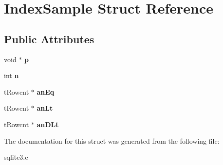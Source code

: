 \hypertarget{structIndexSample}{}\section{Index\+Sample Struct Reference}
\label{structIndexSample}
\subsection*{Public Attributes}
\begin{DoxyCompactItemize}
\item 
void $\ast$ {\bfseries p}\hypertarget{structIndexSample_a539f00d3096fd379146e77e74b513dac}{}\label{structIndexSample_a539f00d3096fd379146e77e74b513dac}

\item 
int {\bfseries n}\hypertarget{structIndexSample_a89016f3b6580ee9c63c4ac78e2e6e76c}{}\label{structIndexSample_a89016f3b6580ee9c63c4ac78e2e6e76c}

\item 
t\+Rowcnt $\ast$ {\bfseries an\+Eq}\hypertarget{structIndexSample_a048e60e638c6e0305812102366822e67}{}\label{structIndexSample_a048e60e638c6e0305812102366822e67}

\item 
t\+Rowcnt $\ast$ {\bfseries an\+Lt}\hypertarget{structIndexSample_a4853d16cdb7cf5099e8478471ae729de}{}\label{structIndexSample_a4853d16cdb7cf5099e8478471ae729de}

\item 
t\+Rowcnt $\ast$ {\bfseries an\+D\+Lt}\hypertarget{structIndexSample_ab17baab68e2890d9939c3840987051c2}{}\label{structIndexSample_ab17baab68e2890d9939c3840987051c2}

\end{DoxyCompactItemize}


The documentation for this struct was generated from the following file\+:\begin{DoxyCompactItemize}
\item 
sqlite3.\+c\end{DoxyCompactItemize}
